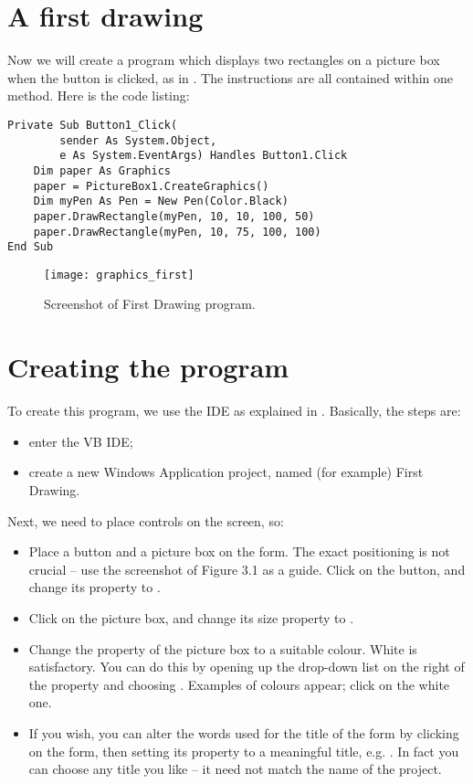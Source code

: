 	\section{A first drawing}
		Now we will create a program which displays two rectangles on a picture box when the button is clicked, as in . The instructions are all contained within one method. Here is the code listing:
		\begin{lstlisting}
Private Sub Button1_Click( 
		sender As System.Object, 
		e As System.EventArgs) Handles Button1.Click
	Dim paper As Graphics
	paper = PictureBox1.CreateGraphics()
	Dim myPen As Pen = New Pen(Color.Black)
	paper.DrawRectangle(myPen, 10, 10, 100, 50)
	paper.DrawRectangle(myPen, 10, 75, 100, 100)
End Sub
		\end{lstlisting}
		\begin{figure}[ht]
			\centering
			\texttt{[image: graphics\_first]}
			\caption{Screenshot of First Drawing program.}
			\label{fig:graphics_first}
		\end{figure}

		
	\section{Creating the program}
		To create this program, we use the IDE as explained in . Basically, the steps are:
		\begin{itemize}
			\item enter the VB IDE;
			\item create a new Windows Application project, named (for example) First Drawing.
		\end{itemize}
		Next, we need to place controls on the screen, so:
		\begin{itemize}
			\item Place a button and a picture box on the form. The exact positioning is not crucial – use the screenshot of Figure 3.1 as a guide. Click on the button, and change its  property to .
			\item Click on the picture box, and change its size property to .
			\item Change the  property of the picture box to a suitable colour. White is satisfactory. You can do this by opening up the drop-down list on the right of the  property and choosing . Examples of colours appear; click on the white one.
			\item If you wish, you can alter the words used for the title of the form by clicking on the form, then setting its  property to a meaningful title, e.g. . In fact you can choose any title you like – it need not match the name of the project.
		\end{itemize}
		
